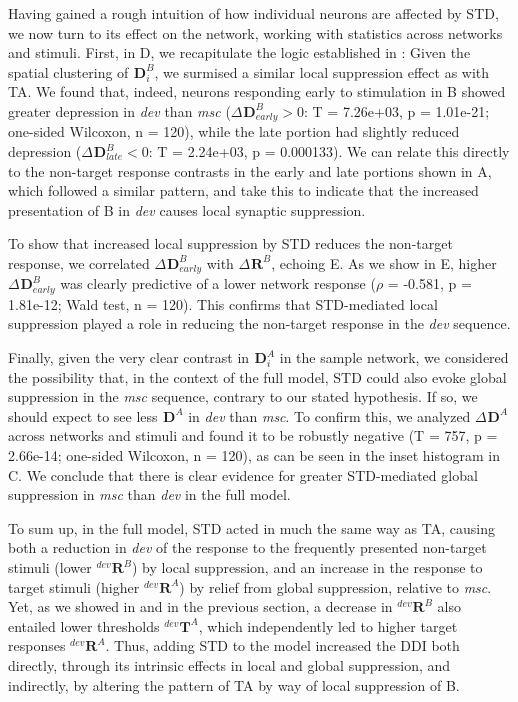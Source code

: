\documentclass[9pt,lineno,onehalfspacing]{elife}
\newcommand{\dev}{\textit{dev}}
\newcommand{\msc}{\textit{msc}}
\newcommand{\R}[3][]{{}^{#1}_{}\boldsymbol R^{#2}_{#3}}
\newcommand{\T}[3][]{{}^{#1}_{}\boldsymbol T^{#2}_{#3}}
\newcommand{\D}[3][]{{}^{#1}_{}\boldsymbol D^{#2}_{#3}}
\begin{document}
Having gained a rough intuition of how individual neurons are affected by STD, we now turn to its effect on the network, working with statistics across networks and stimuli. First, in D, we recapitulate the logic established in : Given the spatial clustering of $\D{B}{i}$, we surmised a similar local suppression effect as with TA. We found that, indeed, neurons responding early to stimulation in B showed greater depression in \dev{} than \msc{} ($\Delta \D{B}{early} > 0$: T = 7.26e+03, p = 1.01e-21; one-sided Wilcoxon, n = 120), while the late portion had slightly reduced depression ($\Delta \D{B}{late} < 0$: T = 2.24e+03, p = 0.000133). We can relate this directly to the non-target response contrasts in the early and late portions shown in A, which followed a similar pattern, and take this to indicate that the increased presentation of B in \dev{} causes local synaptic suppression. %

To show that increased local suppression by STD reduces the non-target response, we correlated $\Delta \D{B}{early}$ with $\Delta \R{B}{}$, echoing E. As we show in E, higher $\Delta \D{B}{early}$ was clearly predictive of a lower network response ($\rho$ = -0.581, p = 1.81e-12; Wald test, n = 120). This confirms that STD-mediated local suppression played a role in reducing the non-target response in the \dev{} sequence.

Finally, given the very clear contrast in $\D{A}{i}$ in the sample network, we considered the possibility that, in the context of the full model, STD could also evoke global suppression in the \msc{} sequence, contrary to our stated hypothesis. If so, we should expect to see less $\D{A}{}$ in \dev{} than \msc{}. To confirm this, we analyzed $\Delta \D{A}{}$ across networks and stimuli and found it to be robustly negative (T = 757, p = 2.66e-14; one-sided Wilcoxon, n = 120), as can be seen in the inset histogram in C. We conclude that there is clear evidence for greater STD-mediated global suppression in \msc{} than \dev{} in the full model.

To sum up, in the full model, STD acted in much the same way as TA, causing both a reduction in \dev{} of the response to the frequently presented non-target stimuli (lower $\R[dev]{B}{}$) by local suppression, and an increase in the response to target stimuli (higher $\R[dev]{A}{}$) by relief from global suppression, relative to \msc{}. Yet, as we showed in  and in the previous section, a decrease in $\R[dev]{B}{}$ also entailed lower thresholds $\T[dev]{A}{}$, which independently led to higher target responses $\R[dev]{A}{}$. Thus, adding STD to the model increased the DDI both directly, through its intrinsic effects in local and global suppression, and indirectly, by altering the pattern of TA by way of local suppression of B.
\end{document}
